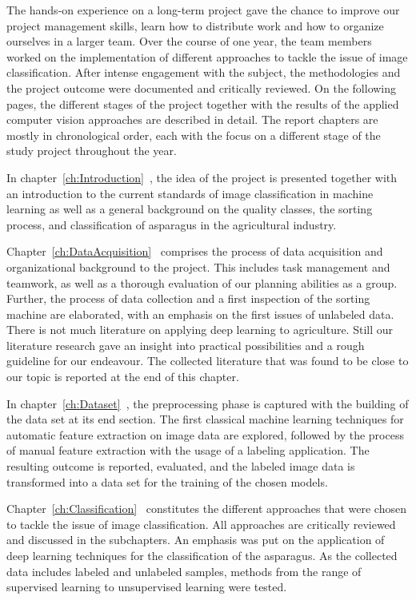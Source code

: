 The hands-on experience on a long-term project gave the chance to improve our project management skills, learn how to distribute work and how to organize ourselves in a larger team. Over the course of one year, the team members worked on the implementation of different approaches to tackle the issue of image classification. After intense engagement with the subject, the methodologies and the project outcome were documented and critically reviewed. On the following pages, the different stages of the project together with the results of the applied computer vision approaches are described in detail. The report chapters are mostly in chronological order, each with the focus on a different stage of the study project throughout the year.

\bigskip
In chapter~\ref{ch:Introduction}~, the idea of the project is presented together with an introduction to the current standards of image classification in machine learning as well as a general background on the quality classes, the sorting process, and classification of asparagus in the agricultural industry.

Chapter~\ref{ch:DataAcquisition}~ comprises the process of data acquisition and organizational background to the project. This includes task management and teamwork, as well as a thorough evaluation of our planning abilities as a group. Further, the process of data collection and a first inspection of the sorting machine are elaborated, with an emphasis on the first issues of unlabeled data. There is not much literature on applying deep learning to agriculture. Still our literature research gave an insight into practical possibilities and a rough guideline for our endeavour. The collected literature that was found to be close to our topic is reported at the end of this chapter.

In chapter~\ref{ch:Dataset}~, the preprocessing phase is captured with the building of the data set at its end section. The first classical machine learning techniques for automatic feature extraction on image data are explored, followed by the process of manual feature extraction with the usage of a labeling application. The resulting outcome is reported, evaluated, and the labeled image data is transformed into a data set for the training of the chosen models.

Chapter~\ref{ch:Classification}~ constitutes the different approaches that were chosen to tackle the issue of image classification. All approaches are critically reviewed and discussed in the subchapters. An emphasis was put on the application of deep learning techniques for the classification of the asparagus. As the collected data includes labeled and unlabeled samples, methods from the range of supervised learning to unsupervised learning were tested.

